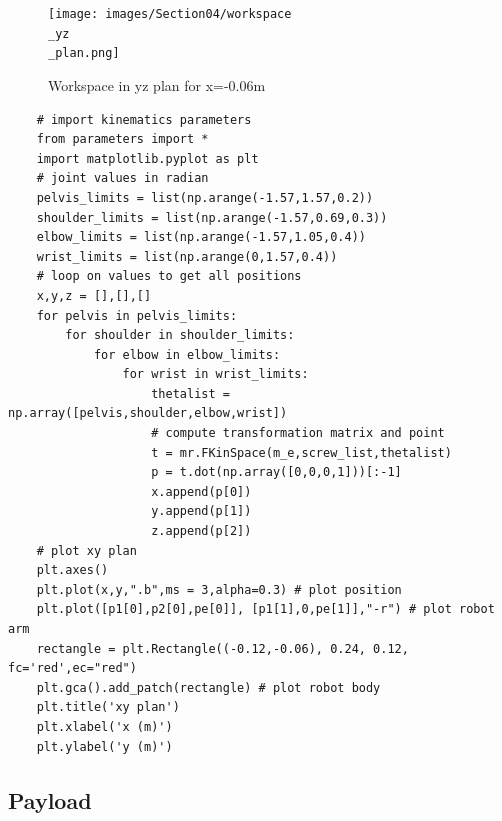 \begin{figure}[ht]
    \centering
    \texttt{[image: images/Section04/workspace\\\_yz\\\_plan.png]}
    \caption{Workspace in yz plan for x=-0.06m }
    \label{fig:mesh24}
\end{figure}
\FloatBarrier

\begin{verbatim}
    # import kinematics parameters
    from parameters import * 
    import matplotlib.pyplot as plt
    # joint values in radian
    pelvis_limits = list(np.arange(-1.57,1.57,0.2))
    shoulder_limits = list(np.arange(-1.57,0.69,0.3))
    elbow_limits = list(np.arange(-1.57,1.05,0.4))
    wrist_limits = list(np.arange(0,1.57,0.4))
    # loop on values to get all positions
    x,y,z = [],[],[]
    for pelvis in pelvis_limits:
        for shoulder in shoulder_limits:
            for elbow in elbow_limits:
                for wrist in wrist_limits:
                    thetalist = np.array([pelvis,shoulder,elbow,wrist])
                    # compute transformation matrix and point
                    t = mr.FKinSpace(m_e,screw_list,thetalist)
                    p = t.dot(np.array([0,0,0,1]))[:-1]
                    x.append(p[0])
                    y.append(p[1])
                    z.append(p[2])
    # plot xy plan
    plt.axes()
    plt.plot(x,y,".b",ms = 3,alpha=0.3) # plot position
    plt.plot([p1[0],p2[0],pe[0]], [p1[1],0,pe[1]],"-r") # plot robot arm
    rectangle = plt.Rectangle((-0.12,-0.06), 0.24, 0.12, fc='red',ec="red") 
    plt.gca().add_patch(rectangle) # plot robot body
    plt.title('xy plan')
    plt.xlabel('x (m)')
    plt.ylabel('y (m)')
    \end{verbatim}

\subsection{Payload}

